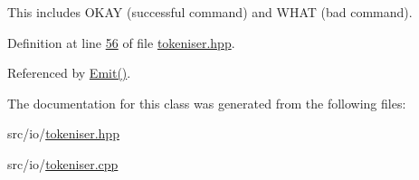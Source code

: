 This includes O\+K\+A\+Y (successful command) and W\+H\+A\+T (bad command). 

Definition at line \hyperlink{tokeniser_8hpp_source_l00056}{56} of file \hyperlink{tokeniser_8hpp_source}{tokeniser.\+hpp}.



Referenced by \hyperlink{tokeniser_8cpp_source_l00113}{Emit()}.



The documentation for this class was generated from the following files\+:\begin{DoxyCompactItemize}
\item 
src/io/\hyperlink{tokeniser_8hpp}{tokeniser.\+hpp}\item 
src/io/\hyperlink{tokeniser_8cpp}{tokeniser.\+cpp}\end{DoxyCompactItemize}
